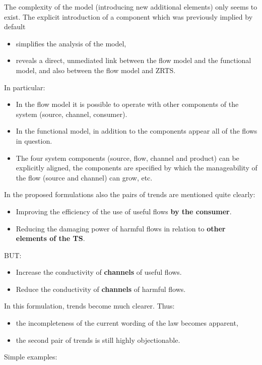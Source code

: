 \documentclass[a4paper,11pt]{article}
\begin{document}
The complexity of the model (introducing new additional elements) only seems
to exist. The explicit introduction of a component which was previously
implied by default
\begin{itemize}
\item simplifies the analysis of the model,
\item reveals a direct, unmediated link between the flow model and the
  functional model, and also between the flow model and ZRTS.
\end{itemize}
In particular:
\begin{itemize}
\item In the flow model it is possible to operate with other components of the
  system (source, channel, consumer).
\item In the functional model, in addition to the components appear all of the
  flows in question.
\item The four system components (source, flow, channel and product) can be
  explicitly aligned, the components are specified by which the manageability
  of the flow (source and channel) can grow, etc.
\end{itemize}
In the proposed formulations also the pairs of trends are mentioned quite
clearly:
\begin{itemize}
\item Improving the efficiency of the use of useful flows \textbf{by the
  consumer}.
\item Reducing the damaging power of harmful flows in relation to
  \textbf{other elements of the TS}.
\end{itemize}
BUT:
\begin{itemize}
\item Increase the conductivity of \textbf{channels} of useful flows.
\item Reduce the conductivity of \textbf{channels} of harmful flows.
\end{itemize}
In this formulation, trends become much clearer. Thus:
\begin{itemize}
\item the incompleteness of the current wording of the law becomes apparent,
\item the second pair of trends is still highly objectionable.
\end{itemize}
Simple examples:
\end{document}
